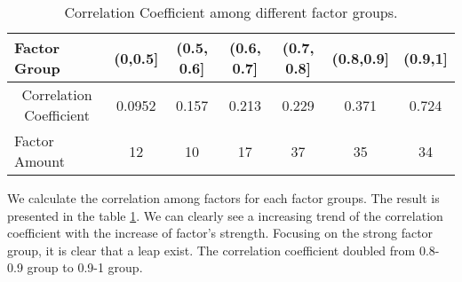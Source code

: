 \begin{table}[h]
	\centering
	\caption{Correlation Coefficient among different factor groups. }
	\label{table:Correlation}
	\begin{tabular}{l|cccccc}
		\hline
		\hline
		Factor Group                                 & (0,0.5{]} & (0.5, 0.6{]} & (0.6, 0.7{]} & (0.7, 0.8{]} & (0.8,0.9{]} & (0.9,1{]} \\ \hline
		\multicolumn{1}{c|}{Correlation Coefficient} & 0.0952    & 0.157        & 0.213        & 0.229        & 0.371       & 0.724   \\
		Factor Amount &12 & 10 &  17 & 37& 35 &34  \\ \hline \hline
	\end{tabular}
\end{table}

We calculate the correlation among factors for each factor groups.
The result is presented in the table \ref{table:Correlation}.
We can clearly see a increasing trend of the correlation coefficient with the increase of factor's strength.
Focusing on the strong factor group, it is clear that a leap exist.
The correlation coefficient doubled from 0.8-0.9 group to 0.9-1 group.

